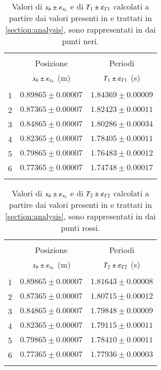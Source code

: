 \begin{table}[t!]
    \centering
    \footnotesize
    \caption{Valori di $x_b\pm\varepsilon_{x_b}$ e di $T_1\pm\varepsilon_{T1}$ calcolati a partire dai valori presenti in  e trattati in \autoref{section:analysis}, sono rappresentati in  dai punti neri.}
    \label{table:t1_values}
    \begin{tabular}{lcc}
        \hline\hline\\[-1.5ex]
          & Posizione                 & Periodi                  \\[+0.5ex]
          & $x_b\pm\varepsilon_{x_b}$ (m) & $T_1\pm\varepsilon_{T1}$ (s) \\[+0.5ex] \hline \\[-1.5ex]
        1 & $0.89865\pm0.00007$       & $1.84369\pm0.00009$      \\[+0.5ex]
        2 & $0.87365\pm0.00007$       & $1.82423\pm0.00011$      \\[+0.5ex]
        3 & $0.84865\pm0.00007$       & $1.80286\pm0.00034$      \\[+0.5ex]
        4 & $0.82365\pm0.00007$       & $1.78405\pm0.00011$      \\[+0.5ex]
        5 & $0.79865\pm0.00007$       & $1.76483\pm0.00012$      \\[+0.5ex]
        6 & $0.77365\pm0.00007$       & $1.74748\pm0.00017$      \\[+0.5ex] \hline \\[-1.5ex]
    \end{tabular}
\end{table}

\begin{table}[t!]
    \centering
    \footnotesize
    \caption{Valori di $x_b\pm\varepsilon_{x_b}$ e di $T_2\pm\varepsilon_{T2}$ calcolati a partire dai valori presenti in  e trattati in \autoref{section:analysis}, sono rappresentati in  dai punti rossi.}
    \label{table:t2_values}
    \begin{tabular}{lcc}
        \hline\hline\\[-1.5ex]
          & Posizione                 & Periodi                  \\[+0.5ex]
          & $x_b\pm\varepsilon_{x_b}$ (m) & $T_2\pm\varepsilon_{T2}$ (s) \\[+0.5ex] \hline \\[-1.5ex]
        1 & $0.89865\pm0.00007$       & $1.81643\pm0.00008$      \\[+0.5ex]
        2 & $0.87365\pm0.00007$       & $1.80715\pm0.00012$      \\[+0.5ex]
        3 & $0.84865\pm0.00007$       & $1.79848\pm0.00009$      \\[+0.5ex]
        4 & $0.82365\pm0.00007$       & $1.79115\pm0.00011$      \\[+0.5ex]
        5 & $0.79865\pm0.00007$       & $1.78410\pm0.00011$      \\[+0.5ex]
        6 & $0.77365\pm0.00007$       & $1.77936\pm0.00003$      \\[+0.5ex] \hline \\[-1.5ex]
    \end{tabular}
\end{table}